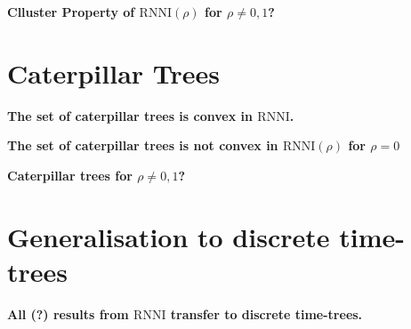 \documentclass[11pt]{amsart}
\newcommand{\rnni}{\mathrm{RNNI}}
\newcommand{\summary}[1]{\textbf{#1}} %
\begin{document}
\summary{Clluster Property of $\rnni(\rho)$ for $\rho \neq 0, 1$?}

\section{Caterpillar Trees}

\summary{The set of caterpillar trees is convex in $\rnni$.}

\summary{The set of caterpillar trees is not convex in $\rnni(\rho)$ for $\rho = 0$}

\summary{Caterpillar trees for $\rho \neq 0,1$?}


\section{Generalisation to discrete time-trees}

\summary{All (?) results from $\rnni$ transfer to discrete time-trees.}
\end{document}
